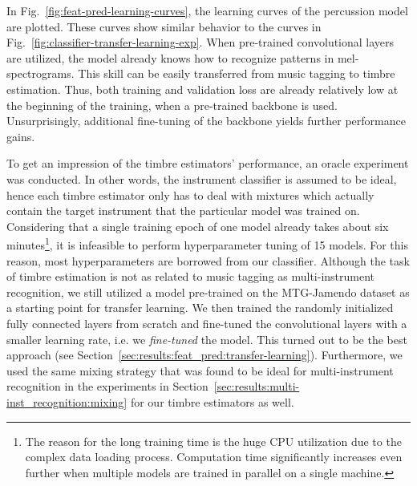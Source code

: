 In Fig.~\ref{fig:feat-pred-learning-curves}, the learning curves of the percussion model are plotted. These curves show similar behavior to the curves in Fig.~\ref{fig:classifier-transfer-learning-exp}. When pre-trained convolutional layers are utilized, the model already knows how to recognize patterns in mel-spectrograms. This skill can be easily transferred from music tagging to timbre estimation. Thus, both training and validation loss are already relatively low at the beginning of the training, when a pre-trained backbone is used. Unsurprisingly, additional fine-tuning of the backbone yields further performance gains.

To get an impression of the timbre estimators' performance,  an oracle experiment was conducted. In other words, the instrument classifier is assumed to be ideal, hence each timbre estimator only has to deal with mixtures which actually contain the target instrument that the particular model was trained on. Considering that a single training epoch of one model already takes about six minutes\footnote{The reason for the long training time is the huge CPU utilization due to the complex data loading process. Computation time significantly increases even further when multiple models are trained in parallel on a single machine.}, it is infeasible to perform hyperparameter tuning of 15 models. For this reason, most hyperparameters are borrowed from our classifier. Although the task of timbre estimation is not as related to music tagging as multi-instrument recognition, we still utilized a model pre-trained on the MTG-Jamendo dataset as a starting point for transfer learning. We then trained the randomly initialized fully connected layers from scratch and fine-tuned the convolutional layers with a smaller learning rate, i.e. we \textit{fine-tuned} the model. This turned out to be the best approach (see Section~\ref{sec:results:feat_pred:transfer-learning}). Furthermore, we used the same mixing strategy that was found to be ideal for multi-instrument recognition in the experiments in Section~\ref{sec:results:multi-inst_recognition:mixing} for our timbre estimators as well.\\


